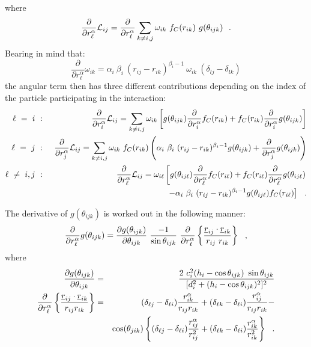 \begin{itemize}
where
\begin{equation}
\frac{\partial}{\partial r_{\ell}^{\alpha}} {\cal{L}}_{ij} =
\frac{\partial}{\partial r_{\ell}^{\alpha}} \sum_{k \neq i,j}
\omega_{ik}~f_{C}(r_{ik})~g(\theta_{ijk})~~.  \nonumber
\end{equation}
Bearing in mind that:
\begin{equation}
\frac{\partial}{\partial r_{\ell}^{\alpha}} \omega_{ik} =
\alpha_{i}~\beta_{i}~(r_{ij}-r_{ik})^{\beta_{i}-1}~\omega_{ik}~(\delta_{lj}-\delta_{lk})
\end{equation}
the angular term then has three different contributions depending
on the index of the particle participating in the interaction:
\begin{eqnarray}
\ell~=~i~&:&~\frac{\partial}{\partial r_{i}^{\alpha}} {\cal{L}}_{ij} = \sum_{k \neq i,j} \omega_{ik}
\left[ g(\theta_{ijk}) \frac{\partial}{\partial r_{i}^{\alpha}} f_{C}(r_{ik}) +
f_{C}(r_{ik}) \frac{\partial}{\partial r_{i}^{\alpha}} g(\theta_{ijk}) \right] \nonumber \\
\ell~=~j~&:&~\frac{\partial}{\partial r_{j}^{\alpha}} {\cal{L}}_{ij} = \sum_{k \neq i,j} \omega_{ik}
~f_{C}(r_{ik}) \left( \alpha_{i}~\beta_{i}~(r_{ij}-r_{ik})^{\beta_{i}-1} g(\theta_{ijk}) +
\frac{\partial}{\partial r_{j}^{\alpha}} g(\theta_{ijk})\right) \nonumber \\
\ell~\neq~i,j~&:&~\frac{\partial}{\partial r_{\ell}^{\alpha}} {\cal{L}}_{ij} = \omega_{i \ell}
\left[ g(\theta_{ij \ell}) \frac{\partial}{\partial r_{\ell}^{\alpha}} f_{C}(r_{i \ell}) +
f_{C}(r_{i \ell}) \frac{\partial}{\partial r_{\ell}^{\alpha}} g(\theta_{ij \ell}) \right. \\
& & \phantom{xxxxxxxxxxxxxxxxxxxxxxxxx}
\left. -\alpha_{i}~\beta_{i}~(r_{ij}-r_{ik})^{\beta_{i}-1} g(\theta_{ij \ell}) f_{C}(r_{i \ell})\right]~~. \nonumber
\end{eqnarray}
\end{itemize}

The derivative of $g(\theta_{ijk})$ is worked out in the following
manner:
\begin{equation}
\frac{\partial}{\partial r_{\ell}^{\alpha}} g(\theta_{ijk}) =
\frac{\partial g(\theta_{ijk})}{\partial \theta_{ijk}}~
\frac{-1}{\sin \theta_{ijk}}~\frac{\partial}{\partial r_{\ell}^{\alpha}}
\left\{ \frac{\mbox{$\underline{r}$}_{ij} \cdot \mbox{$\underline{r}$}_{ik}} {r_{ij}~r_{ik}} \right\}~~,
\end{equation}
where
\begin{eqnarray}
\frac{\partial g(\theta_{ijk})}{\partial \theta_{ijk}}&=&
\frac{2~c_{i}^{2}(h_{i} - \cos \theta_{ijk})~\sin \theta_{ijk}}
{[d_{i}^{2} + (h_{i} - \cos \theta_{ijk})^{2}]^{2}} \\
\frac{\partial}{\partial r_{\ell}^{\alpha}}
\left\{\frac{\mbox{$\underline{r}$}_{ij}\cdot\mbox{$\underline{r}$}_{ik}}{r_{ij}r_{ik}}\right\}&=&
(\delta_{\ell j}-\delta_{\ell i})\frac{r_{ik}^{\alpha}}{r_{ij}r_{ik}} +
(\delta_{\ell k}-\delta_{\ell i})\frac{r_{ij}^{\alpha}}{r_{ij}r_{ik}} - \nonumber \\
& & \cos(\theta_{jik}) \left\{(\delta_{\ell j}-\delta_{\ell i})\frac{r_{ij}^{\alpha}}{r_{ij}^{2}}+
(\delta_{\ell k}-\delta_{\ell i})\frac{r_{ik}^{\alpha}}{r_{ik}^{2}}\right\}~~.
\end{eqnarray}

